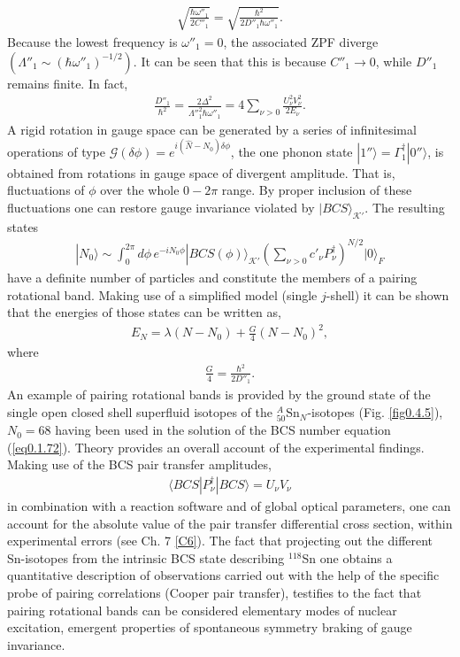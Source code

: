 \documentclass[a4paper,11pt]{book}
\numberwithin{equation}{section}
\numberwithin{figure}{section}
\numberwithin{table}{section}
\newcommand{\braket}[1]{\langle {#1} \rangle }
\newcommand{\ket}[1]{|{#1} \rangle }
\begin{document}
\begin{align}\label{eq0.1.99}
\sqrt{\frac{\hbar\omega''_1}{2C''_1}}=\sqrt{\frac{\hbar^2}{2D''_1\hbar\omega''_1}}.
\end{align}
Because the lowest frequency is $\omega''_1=0$, the associated ZPF diverge $(\Lambda''_1\sim(\hbar\omega''_1)^{-1/2})$. It can be seen that this is because $C''_1\to0$, while $D''_1$ remains finite. In fact,
\begin{align}\label{eq0.1.100}
\frac{D''_1}{\hbar^2}=\frac{2\Delta^2}{\Lambda''^2_1\hbar\omega''_1}=4\sum_{\nu>0}\frac{U^2_\nu V^2_\nu}{2E_\nu}.
\end{align}
 A rigid rotation in gauge space can be generated by a series of infinitesimal operations of type $\mathcal G(\delta\phi)=e^{i(\hat N-N_0)\delta\phi}$, the one phonon state $\ket{1''}=\Gamma^\dagger_1\ket{0''}$, is obtained from rotations in gauge space of divergent amplitude. That is, fluctuations of $\phi$ over the whole $0-2\pi$ range. By proper inclusion of these fluctuations one can restore gauge invariance violated by $\ket{BCS}_{\mathcal K'}$. The resulting states
\begin{align}\label{eq0.1.101}
\ket{N_0}\sim\int^{2\pi}_0d\phi\,e^{-iN_0\phi}\ket{BCS(\phi)}_{\mathcal K'}\left(\sum_{\nu>0}c'_\nu P^\dagger_\nu\right)^{N/2}\ket{0}_F
\end{align}
have a definite number of particles and constitute the members of a pairing rotational band. Making use of a simplified model (single $j$-shell) it can be shown that the energies of those states can be written as,
\begin{align}\label{eq0.1.102}
E_N=\lambda(N-N_0)+\frac{G}{4}\left(N-N_0\right)^2,
\end{align}
where 
\begin{align}\label{eq0.1.103}
\frac{G}{4}=\frac{\hbar^2}{2D''_1}.
\end{align}
An example of pairing rotational bands is provided by the ground state of the single open closed shell superfluid isotopes of the $^A_{50}$Sn$_N$-isotopes (Fig. \ref{fig0.4.5}), $N_0=68$ having been used in the solution of the BCS number equation (\ref{eq0.1.72}). Theory provides an overall account of the experimental findings. Making use of the BCS pair transfer amplitudes,
\begin{align}\label{eq0.1.104}
\braket{BCS|P^\dagger_\nu|BCS}=U_\nu V_\nu
\end{align}
in combination with a reaction software and of global optical parameters, one can account for the absolute value of the pair transfer differential cross section, within experimental errors (see Ch. 7 \ref{C6}). The fact that projecting out the different Sn-isotopes from the intrinsic BCS state describing $^{118}$Sn one obtains a quantitative description of observations carried out with the help of the specific probe of pairing correlations (Cooper pair transfer), testifies to the fact that pairing rotational bands can be considered elementary modes of nuclear excitation, emergent properties of spontaneous symmetry braking of  gauge invariance. 
\end{document}
